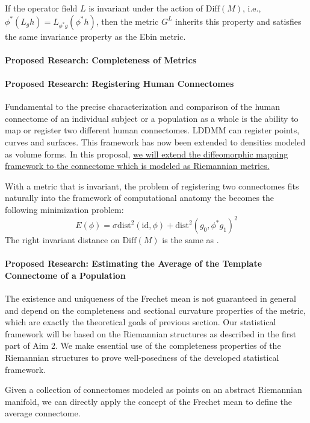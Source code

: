 \documentclass{article}
\theoremstyle{definition}
\theoremstyle{plain}
\begin{document}
If the operator field $L$ is invariant under the action of $\mathrm{Diff}(M)$, i.e., $\phi^*(L_gh)=L_{\phi^*g}(\phi^* h)$, then the metric $G^L$ inherits this property and satisfies the same invariance property as the Ebin metric.

\paragraph{Proposed Research: Completeness of Metrics}


\paragraph{Proposed Research: Registering Human Connectomes}
Fundamental to the precise characterization and comparison of the human connectome of an individual subject or a population as a whole is the ability to map or register two different human connectomes. LDDMM can register points, curves and surfaces. This framework has now been extended to densities modeled as volume forms. In this proposal, \underline{we will extend the diffeomorphic mapping framework to the connectome which is modeled as Riemannian metrics.}

With a metric that is invariant, the problem of registering two connectomes fits naturally into the framework of computational anatomy the becomes the following minimization problem:
\begin{equation*}
    E(\phi)=\sigma\mathrm{dist}^2(\mathrm{id},\phi)+\mathrm{dist}^2(g_0,\phi^*g_1)^2
\end{equation*}
The right invariant distance on $\mathrm{Diff}(M)$ is the same as \cite{joshi}.

\paragraph{Proposed Research: Estimating the Average of the Template Connectome of a Population} The existence and uniqueness of the Frechet mean is not guaranteed in general and depend on the completeness and sectional curvature properties of the metric, which are exactly the theoretical goals of previous section. Our statistical framework will be based on the Riemannian structures as described in the first part of Aim 2. We make essential use of the completeness properties of the Riemannian structures to prove well-posedness of the developed statistical framework.

Given a collection of connectomes modeled as points on an abstract Riemannian manifold, we can directly apply the concept of the Frechet mean to define the average connectome.
\end{document}
